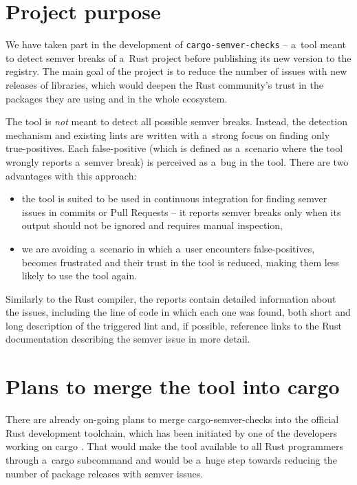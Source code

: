 \documentclass[licencjacka,en]{pracamgr}
\begin{document}
\section{Project purpose}\label{r:section_project_purpose}

We have taken part in the development of \texttt{cargo-semver-checks} -- a~tool meant to detect
semver breaks of a~Rust project before publishing its new version to the registry. The main goal
of the project is to reduce the number of issues with new releases of libraries, which would deepen
the Rust community's trust in the packages they are using and in the whole ecosystem.

The tool is \textit{not} meant to detect all possible semver breaks. Instead, the detection
mechanism and existing lints are written with a~strong focus on finding only true-positives.
Each false-positive (which is defined as a~scenario where the tool wrongly reports a~semver break)
is perceived as a~bug in the tool. There are two advantages with this approach:
\begin{itemize}
	\item the tool is suited to be used in continuous integration for finding semver issues in
		commits or Pull Requests -- it reports semver breaks only when its output should not be
		ignored and requires manual inspection,
	\item we are avoiding a~scenario in which a~user encounters false-positives, becomes
		frustrated and their trust in the tool is reduced, making them less likely to use the
		tool again.
\end{itemize}

Similarly to the Rust compiler, the reports contain detailed information about the issues,
including the line of code in which each one was found, both short and long description of the
triggered lint and, if possible, reference links to the Rust documentation describing the semver
issue in more detail.

\section{Plans to merge the tool into cargo}\label{r:section_merge_into_cargo_plans}

There are already on-going plans to merge cargo-semver-checks into the official Rust development
toolchain, which has been initiated by one of the developers working on cargo
\cite{issue-merge-cargo}. That would make the tool available to all Rust programmers through
a~cargo subcommand and would be a~huge step towards reducing the number of package releases with
semver issues.
\end{document}
